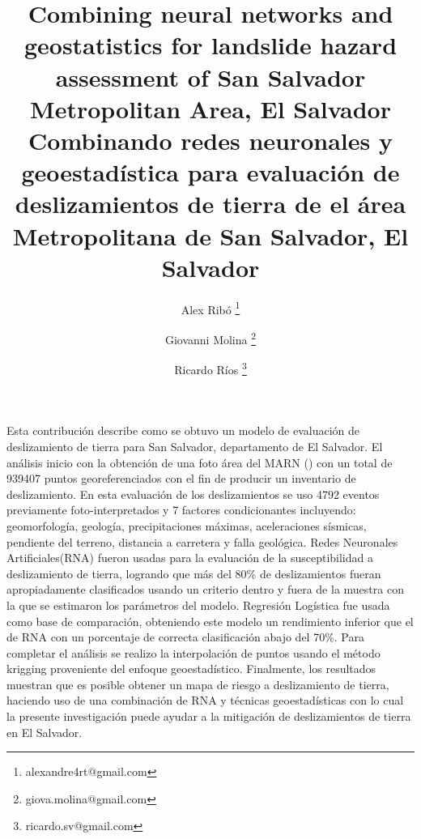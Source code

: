 \documentclass[11pt,twoside]{rmta2010esp}%
\begin{document}
\title{Combining neural networks and geostatistics for landslide hazard assessment of San Salvador Metropolitan Area, El Salvador 
\newline
\newline
Combinando redes neuronales y geoestad\'{i}stica para evaluaci\'{o}n de deslizamientos de tierra de el \'{a}rea Metropolitana de San Salvador, El Salvador}

\author[1]{Alex Rib\'{o} \thanks{alexandre4rt@gmail.com }}
\author[2]{Giovanni Molina \thanks{giova.molina@gmail.com}}
\author[3]{Ricardo Ríos \thanks{ricardo.sv@gmail.com}}





\maketitle


\begin{resumen}
Esta contribución describe como se obtuvo un modelo de evaluación de deslizamiento de tierra para San Salvador, departamento de El Salvador. El análisis inicio con la obtención de una foto área del MARN () con un total de 939407 puntos georeferenciados con el fin de producir un inventario de deslizamiento. En esta evaluación de los deslizamientos se uso 4792 eventos previamente foto-interpretados y 7 factores condicionantes incluyendo: geomorfología, geología, precipitaciones máximas, aceleraciones sísmicas, pendiente del terreno, distancia a carretera y falla geológica. Redes Neuronales Artificiales(RNA) fueron usadas para la evaluación de la susceptibilidad a deslizamiento de tierra, logrando que más del 80\% de deslizamientos fueran apropiadamente clasificados usando un criterio dentro y fuera de la muestra con la que se estimaron los parámetros del modelo. Regresión Logística fue usada como base de comparación, obteniendo este modelo un rendimiento inferior que el de RNA con un porcentaje de correcta clasificación abajo del 70\%. Para completar el análisis se realizo la interpolación de puntos usando el método krigging proveniente del enfoque geoestadístico. Finalmente, los resultados muestran que es posible obtener un mapa de riesgo a deslizamiento de tierra, haciendo uso de una combinación de RNA y técnicas geoestadísticas con lo cual la presente investigación puede ayudar a la mitigación de deslizamientos de tierra en El Salvador.
\end{resumen}
\end{document}
